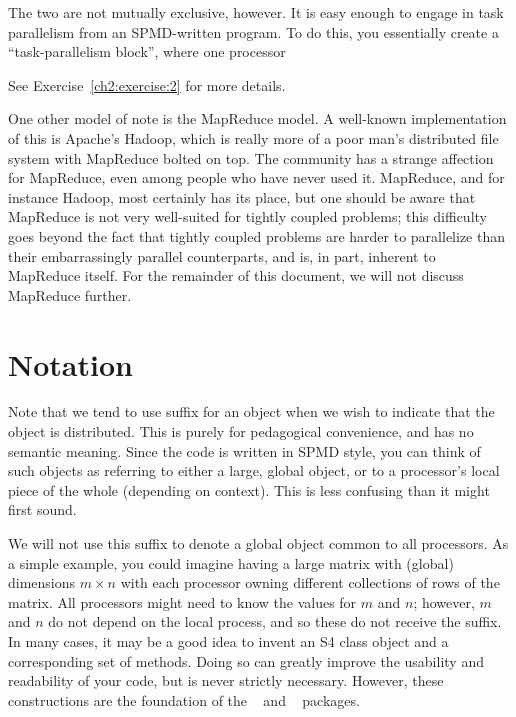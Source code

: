 The two are not mutually exclusive, however.  It is easy enough to engage in task parallelism from an SPMD-written program.  To do this, you essentially create a ``task-parallelism block'', where one processor


See Exercise~\ref{ch2:exercise:2} for more details.

One other model of note is the MapReduce model. 
A well-known implementation of this is Apache's Hadoop, 
which is really more of a poor man's distributed file system with MapReduce 
bolted on top.  The  community has a strange affection for 
MapReduce, even among people who have never used it.  MapReduce, and for 
instance Hadoop, most certainly has its place, but one should be aware that 
MapReduce is not very well-suited for tightly coupled problems; this difficulty 
goes beyond the fact that tightly coupled problems are harder to parallelize 
than their embarrassingly parallel counterparts, and is, in part, inherent to 
MapReduce itself.  For the remainder of this document, we will not discuss 
MapReduce further.  




\section{Notation}
\label{sec:notation}

Note that we tend to use suffix
 for an object when we wish to indicate
that the object is distributed.  This is purely for pedagogical convenience,
and has no semantic meaning. Since the code is written in SPMD style, you
can think of such objects as referring to either a large, global object, or
to a processor's local piece of the whole (depending on context).
This is less confusing than it might first sound.

We will not use this suffix to denote a global object common to all processors.
As a simple example, you could imagine having a large matrix with (global)
dimensions $m\times n$ with each processor owning different collections of
rows of the matrix. All processors might need to know the values for
$m$ and $n$; however, $m$ and $n$ do not depend on the local process, and
so these do not receive the  suffix. In many cases, it may be
a good idea to invent an S4 class object and a corresponding set of methods.
Doing so can greatly improve the usability and readability of your code, but
is never strictly necessary. However, these constructions are the foundation
of the
~\citep{Schmidt2012pbdBASEpackage} and
~\citep{Schmidt2012pbdDMATpackage} packages.


